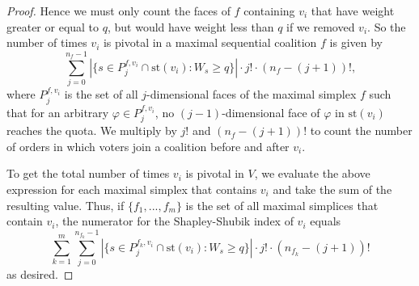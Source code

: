 \documentclass[10pt,a4paper]{amsart}
\begin{document}
\begin{proof}
Hence we must only count the faces of $f$ containing $v_i$ that have weight greater or equal to $q$, but would have weight less than $q$ if we removed $v_i$. So the number of times $v_i$ is pivotal in a maximal sequential coalition $f$ is given by
$$\sum_{j=0}^{n_f-1} |\{s\in P_{j}^{f, v_i} \cap \text{st}(v_i): W_s \geq q\}|\cdot j! \cdot (n_f-(j+1))!,$$
where $P_{j}^{f, v_i}$ is the set of all $j$-dimensional faces of the maximal simplex $f$ such that for an arbitrary $\varphi \in P_{j}^{f, v_i}$, no $(j-1)$-dimensional face of $\varphi$ in $\text{st}(v_i)$ reaches the quota.
We multiply by $j!$ and $(n_f-(j+1))!$ to count the number of orders in which voters join a coalition before and after $v_i$.

To get the total number of times $v_i$ is pivotal in $V$, we evaluate the above expression for each maximal simplex that contains $v_i$ and take the sum of the resulting value. Thus, if $\{f_1,...,f_m\}$ is the set of all maximal simplices that contain $v_i$, the numerator for the Shapley-Shubik index of $v_i$ equals
$$\sum_{k=1}^{m} \sum_{j=0}^{n_{f_k}-1} |\{s\in P_{j}^{f_k, v_i} \cap \text{st}(v_i): W_s \geq q\}|\cdot j! \cdot (n_{f_k}-(j+1))!$$
as desired.
%
%
\end{proof}
\end{document}

